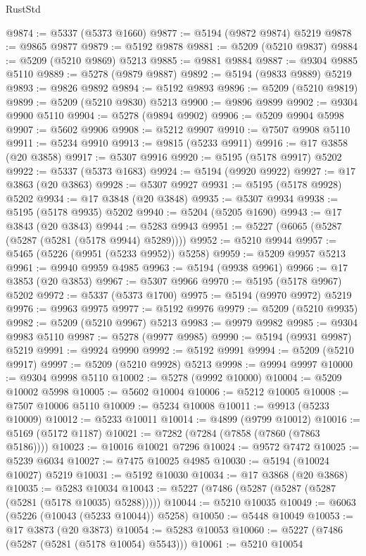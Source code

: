\begin{lexlean}{RustStd}
\begin{coremodule}
@9874 := @5337 (@5373 @1660)
@9877 := @5194 (@9872 @9874) @5219
@9878 := @9865 @9877
@9879 := @5192 @9878
@9881 := @5209 (@5210 @9837)
@9884 := @5209 (@5210 @9869) @5213
@9885 := @9881 @9884
@9887 := @9304 @9885 @5110
@9889 := @5278 (@9879 @9887)
@9892 := @5194 (@9833 @9889) @5219
@9893 := @9826 @9892
@9894 := @5192 @9893
@9896 := @5209 (@5210 @9819)
@9899 := @5209 (@5210 @9830) @5213
@9900 := @9896 @9899
@9902 := @9304 @9900 @5110
@9904 := @5278 (@9894 @9902)
@9906 := @5209 @9904 @5998
@9907 := @5602 @9906
@9908 := @5212 @9907
@9910 := @7507 @9908 @5110
@9911 := @5234 @9910
@9913 := @9815 (@5233 @9911)
@9916 := @17 @3858 (@20 @3858)
@9917 := @5307 @9916
@9920 := @5195 (@5178 @9917) @5202
@9922 := @5337 (@5373 @1683)
@9924 := @5194 (@9920 @9922)
@9927 := @17 @3863 (@20 @3863)
@9928 := @5307 @9927
@9931 := @5195 (@5178 @9928) @5202
@9934 := @17 @3848 (@20 @3848)
@9935 := @5307 @9934
@9938 := @5195 (@5178 @9935) @5202
@9940 := @5204 (@5205 @1690)
@9943 := @17 @3843 (@20 @3843)
@9944 := @5283 @9943
@9951 := @5227 (@6065 (@5287 (@5287 (@5281 (@5178 @9944) @5289))))
@9952 := @5210 @9944
@9957 := @5465 (@5226 (@9951 (@5233 @9952)) @5258)
@9959 := @5209 @9957 @5213
@9961 := @9940 @9959 @4985
@9963 := @5194 (@9938 @9961)
@9966 := @17 @3853 (@20 @3853)
@9967 := @5307 @9966
@9970 := @5195 (@5178 @9967) @5202
@9972 := @5337 (@5373 @1700)
@9975 := @5194 (@9970 @9972) @5219
@9976 := @9963 @9975
@9977 := @5192 @9976
@9979 := @5209 (@5210 @9935)
@9982 := @5209 (@5210 @9967) @5213
@9983 := @9979 @9982
@9985 := @9304 @9983 @5110
@9987 := @5278 (@9977 @9985)
@9990 := @5194 (@9931 @9987) @5219
@9991 := @9924 @9990
@9992 := @5192 @9991
@9994 := @5209 (@5210 @9917)
@9997 := @5209 (@5210 @9928) @5213
@9998 := @9994 @9997
@10000 := @9304 @9998 @5110
@10002 := @5278 (@9992 @10000)
@10004 := @5209 @10002 @5998
@10005 := @5602 @10004
@10006 := @5212 @10005
@10008 := @7507 @10006 @5110
@10009 := @5234 @10008
@10011 := @9913 (@5233 @10009)
@10012 := @5233 @10011
@10014 := @4899 (@9799 @10012)
@10016 := @5169 (@5172 @1187)
@10021 := @7282 (@7284 (@7858 (@7860 (@7863 @5186))))
@10023 := @10016 @10021 @7296
@10024 := @9572 @7472
@10025 := @5239 @6034
@10027 := @7475 @10025 @4985
@10030 := @5194 (@10024 @10027) @5219
@10031 := @5192 @10030
@10034 := @17 @3868 (@20 @3868)
@10035 := @5283 @10034
@10043 := @5227 (@7486 (@5287 (@5287 (@5287 (@5281 (@5178 @10035) @5288)))))
@10044 := @5210 @10035
@10049 := @6063 (@5226 (@10043 (@5233 @10044)) @5258)
@10050 := @5448 @10049
@10053 := @17 @3873 (@20 @3873)
@10054 := @5283 @10053
@10060 := @5227 (@7486 (@5287 (@5281 (@5178 @10054) @5543)))
@10061 := @5210 @10054

\end{coremodule}
\end{lexlean}
